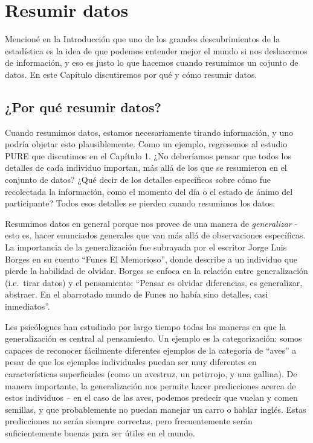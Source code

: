 \documentclass[
  12pt,
]{book}
\begin{document}
\hypertarget{resumir-datos}{%
\chapter{Resumir datos}\label{resumir-datos}}

Mencioné en la Introducción que uno de los grandes descubrimientos de la estadística es la idea de que podemos entender mejor el mundo si nos deshacemos de información, y eso es justo lo que hacemos cuando resumimos un cojunto de datos.
En este Capítulo discutiremos por qué y cómo resumir datos.

\hypertarget{por-quuxe9-resumir-datos}{%
\section{¿Por qué resumir datos?}\label{por-quuxe9-resumir-datos}}

Cuando resumimos datos, estamos necesariamente tirando información, y uno podría objetar esto plausiblemente. Como un ejemplo, regresemos al estudio PURE que discutimos en el Capítulo 1. ¿No deberíamos pensar que todos los detalles de cada individuo importan, más allá de los que se resumieron en el conjunto de datos? ¿Qué decir de los detalles específicos sobre cómo fue recolectada la información, como el momento del día o el estado de ánimo del participante? Todos esos detalles se pierden cuando resumimos los datos.

Resumimos datos en general porque nos provee de una manera de \emph{generalizar} - esto es, hacer enunciados generales que van más allá de observaciones específicas. La importancia de la generalización fue subrayada por el escritor Jorge Luis Borges en su cuento ``Funes El Memorioso'', donde describe a un individuo que pierde la habilidad de olvidar. Borges se enfoca en la relación entre generalización (i.e.~tirar datos) y el pensamiento: ``Pensar es olvidar diferencias, es generalizar, abstraer. En el abarrotado mundo de Funes no había sino detalles, casi inmediatos''.

Les psicólogues han estudiado por largo tiempo todas las maneras en que la generalización es central al pensamiento. Un ejemplo es la categorización: somos capaces de reconocer fácilmente diferentes ejemplos de la categoría de ``aves'' a pesar de que los ejemplos individuales puedan ser muy diferentes en características superficiales (como un avestruz, un petirrojo, y una gallina). De manera importante, la generalización nos permite hacer predicciones acerca de estos individuos -- en el caso de las aves, podemos predecir que vuelan y comen semillas, y que probablemente no puedan manejar un carro o hablar inglés. Estas predicciones no serán siempre correctas, pero frecuentemente serán suficientemente buenas para ser útiles en el mundo.
\end{document}
